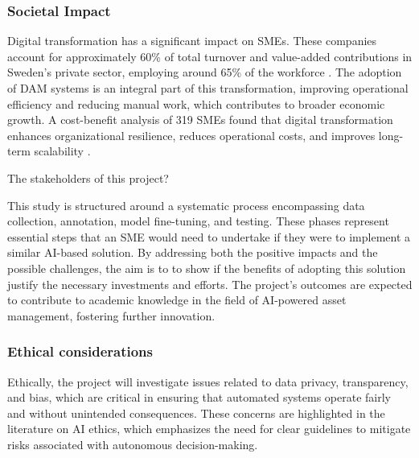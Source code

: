 \documentclass[a4paper,10pt,twocolumn]{article}
\numberwithin{figure}{section}
\numberwithin{table}{section}
\begin{document}
\subsubsection{Societal Impact}
\vspace{0.2cm}
Digital transformation has a significant impact on SMEs.
These companies account for approximately 60\% of total turnover and value-added 
contributions in Sweden’s private sector, employing around 65\% of the 
workforce \citep{tillvaxtverket2021}.
The adoption of DAM systems is an integral part of this transformation, 
improving operational efficiency and reducing manual work,
which contributes to broader economic growth. A cost-benefit analysis of 319 SMEs 
found that digital transformation enhances organizational resilience, reduces 
operational costs, and improves long-term scalability \citep{teng2022}.

\vspace{0.3cm}
The stakeholders of this project?

This study is structured around a systematic process 
encompassing data collection, annotation, model fine-tuning, and testing. 
These phases represent essential steps that an SME would need to undertake 
if they were to implement a similar AI-based solution. 
By addressing both the positive impacts and the possible challenges, the aim is to
to show if the benefits of adopting this solution
justify the necessary investments and efforts.
The project’s outcomes are expected to contribute to 
academic knowledge in the field of AI-powered asset management, 
fostering further innovation. 

\vspace{0.3cm}
\subsubsection{Ethical considerations}
\vspace{0.2cm}
Ethically, the project will investigate issues related to data privacy, 
 transparency, and bias, which are critical in ensuring that 
automated systems operate fairly and without unintended consequences. 
These concerns are highlighted in the literature on AI ethics, which emphasizes 
the need for clear guidelines to mitigate risks associated with autonomous decision-making\citep{jobin2019global}.

\vspace{0.3cm}
\end{document}
